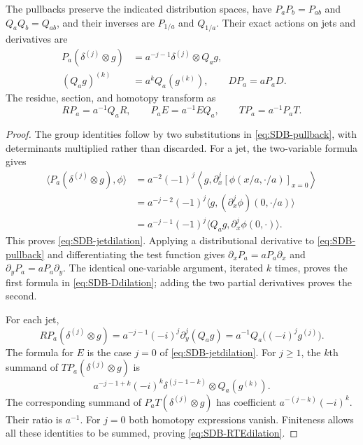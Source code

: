 \begin{proposition}
\label{prop:SDB-covariance}
The pullbacks preserve the indicated distribution spaces, have
$P_aP_b=P_{ab}$ and $Q_aQ_b=Q_{ab}$, and their inverses are
$P_{1/a}$ and $Q_{1/a}$. Their exact actions on jets and derivatives are
\begin{align}
 P_a(\delta^{(j)}\otimes g)
   &=a^{-j-1}\delta^{(j)}\otimes Q_a g,
       &&\tag{SDB19}\label{eq:SDB-jetdilation}\\
 (Q_a g)^{(k)}&=a^k Q_a(g^{(k)}),\qquad
 DP_a=aP_aD.
       &&\tag{SDB20}\label{eq:SDB-Ddilation}
\end{align}
The residue, section, and homotopy transform as
\begin{equation}\tag{SDB21}\label{eq:SDB-RTEdilation}
 RP_a=a^{-1}Q_aR,\qquad
 P_aE=a^{-1}EQ_a,\qquad
 TP_a=a^{-1}P_aT.
\end{equation}
\end{proposition}
\begin{proof}
The group identities follow by two substitutions in
\eqref{eq:SDB-pullback}, with determinants multiplied rather than
discarded. For a jet, the two-variable formula gives
\[
 \begin{aligned}
 \langle P_a(\delta^{(j)}\otimes g),\phi\rangle
 &=a^{-2}(-1)^j
   \left\langle g,
      \partial_x^j[\phi(x/a,\cdot/a)]_{x=0}\right\rangle\\
 &=a^{-j-2}(-1)^j
     \langle g,(\partial_x^j\phi)(0,\cdot/a)\rangle\\
 &=a^{-j-1}(-1)^j
     \langle Q_a g,\partial_x^j\phi(0,\cdot)\rangle.
 \end{aligned}
\]
This proves \eqref{eq:SDB-jetdilation}. Applying a distributional
derivative to \eqref{eq:SDB-pullback} and differentiating the test
function gives $\partial_xP_a=aP_a\partial_x$ and
$\partial_yP_a=aP_a\partial_y$. The identical one-variable argument,
iterated $k$ times, proves the first formula in
\eqref{eq:SDB-Ddilation}; adding the two partial derivatives proves
the second.

For each jet,
\[
 RP_a(\delta^{(j)}\otimes g)
 =a^{-j-1}(-i)^j\partial_y^j(Q_a g)
 =a^{-1}Q_a\bigl((-i)^j g^{(j)}\bigr).
\]
The formula for $E$ is the case $j=0$ of
\eqref{eq:SDB-jetdilation}. For $j\geq1$, the $k$th summand of
$TP_a(\delta^{(j)}\otimes g)$ is
\[
 a^{-j-1+k}(-i)^k\delta^{(j-1-k)}\otimes Q_a(g^{(k)}).
\]
The corresponding summand of $P_aT(\delta^{(j)}\otimes g)$ has
coefficient $a^{-(j-k)}(-i)^k$. Their ratio is $a^{-1}$.
For $j=0$ both homotopy expressions vanish. Finiteness allows all
these identities to be summed, proving \eqref{eq:SDB-RTEdilation}.
\end{proof}

